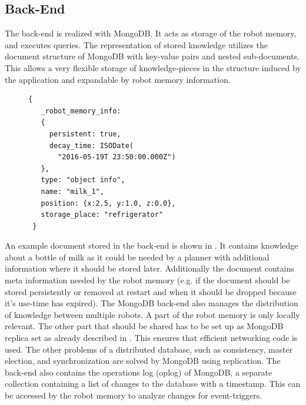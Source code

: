 \subsection{Back-End}
\label{sec:back-end}
The back-end is realized with MongoDB. It acts as storage of the robot
memory, and executes queries. The representation of stored knowledge
utilizes the document structure of MongoDB with key-value pairs and
nested sub-documents. This allows a very flexible storage of
knowledge-pieces in the structure induced by the application and
expandable by robot memory information.

\begin{figure}
  \vspace{-0.8cm}
\begin{lstlisting}[style=SmallJSON,
  caption={Representation of a knowledge piece in the back-end},
  label=lst:backend,
  framexleftmargin=1pt, xleftmargin=0pt,
 morekeywords={}, numbers=none]
 {
   _robot_memory_info:
   {
     persistent: true,
     decay_time: ISODate(
       "2016-05-19T 23:50:00.000Z")
   },
   type: "object info",
   name: "milk_1",
   position: {x:2.5, y:1.0, z:0.0},
   storage_place: "refrigerator"
 }
\end{lstlisting}
\vspace{-14mm}
\end{figure}
An example document stored in the back-end is shown in
.  It contains knowledge about a bottle of milk as
it could be needed by a planner with additional information where it
should be stored later. Additionally the document contains meta
information needed by the robot memory (e.g. if the document should be
stored persistently or removed at restart and when it should be
dropped because it's use-time has expired). The MongoDB back-end also
manages the distribution of knowledge between multiple robots. A part
of the robot memory is only locally relevant. The other part that
should be shared has to be set up as MongoDB replica set as already
described in . This ensures that efficient
networking code is used. The other problems of a distributed database,
such as consistency, master election, and synchronization are solved
by MongoDB using replication. The back-end also contains the
operations log (oplog) of MongoDB, a separate
collection containing a list of changes to the database with a
timestamp. This can be accessed by the robot memory to analyze
changes for event-triggers.

